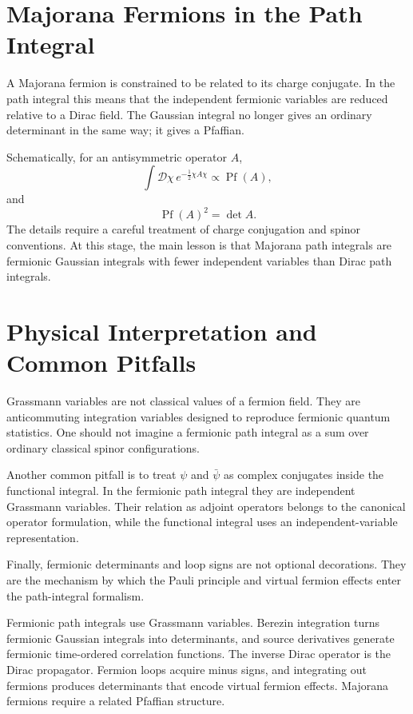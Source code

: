 \section{Majorana Fermions in the Path Integral}

A Majorana fermion is constrained to be related to its charge conjugate. In the
path integral this means that the independent fermionic variables are reduced
relative to a Dirac field. The Gaussian integral no longer gives an ordinary
determinant in the same way; it gives a Pfaffian.

Schematically, for an antisymmetric operator \(A\),
\[
    \int\mathcal{D}\chi\,e^{-\frac{1}{2}\chi A\chi}
    \propto \operatorname{Pf}(A),
\]
and
\[
    \operatorname{Pf}(A)^2=\det A.
\]
The details require a careful treatment of charge conjugation and spinor
conventions. At this stage, the main lesson is that Majorana path integrals are
fermionic Gaussian integrals with fewer independent variables than Dirac path
integrals.

\section{Physical Interpretation and Common Pitfalls}

Grassmann variables are not classical values of a fermion field. They are
anticommuting integration variables designed to reproduce fermionic quantum
statistics. One should not imagine a fermionic path integral as a sum over
ordinary classical spinor configurations.

Another common pitfall is to treat \(\psi\) and \(\bar\psi\) as complex
conjugates inside the functional integral. In the fermionic path integral they
are independent Grassmann variables. Their relation as adjoint operators belongs
to the canonical operator formulation, while the functional integral uses an
independent-variable representation.

Finally, fermionic determinants and loop signs are not optional decorations.
They are the mechanism by which the Pauli principle and virtual fermion effects
enter the path-integral formalism.

\begin{summarybox}
Fermionic path integrals use Grassmann variables. Berezin integration turns
fermionic Gaussian integrals into determinants, and source derivatives generate
fermionic time-ordered correlation functions. The inverse Dirac operator is the
Dirac propagator. Fermion loops acquire minus signs, and integrating out
fermions produces determinants that encode virtual fermion effects. Majorana
fermions require a related Pfaffian structure.
\end{summarybox}

